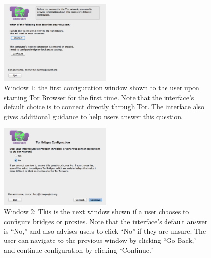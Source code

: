 \documentclass{template}
\begin{document}
\begin{figure}[h]
\label{fig:window1}
  \centering
    \includegraphics[width=0.5\textwidth]{window1.png}
    \caption{Window 1: the first configuration window shown to the user upon
    starting Tor Browser for the first time. Note that the interface's default choice
    is to connect directly through Tor. The interface also gives additional guidance
    to help users answer this question.}
\end{figure}

\begin{figure}[h]
\label{fig:window2}
  \centering
    \includegraphics[width=0.5\textwidth]{window2.png}
    \caption{Window 2: This is the next window shown if a user chooses to configure 
    bridges or proxies. Note that the interface's default answer is ``No,'' 
    and also advises users to click ``No'' if they are unsure. The user can navigate to the 
    previous window by clicking ``Go Back,'' and continue configuration by clicking 
    ``Continue.''}
\end{figure}
\end{document}
